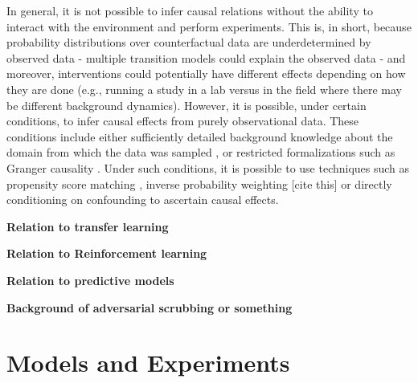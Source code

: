 \documentclass{article}
\begin{document}
In general, it is not possible to infer causal relations without the ability to interact with the environment and perform experiments. This is, in short, because probability distributions over counterfactual data are underdetermined by observed data - multiple transition models could explain the observed data - and moreover, interventions could potentially have different effects depending on how they are done (e.g., running a study in a lab versus in the field where there may be different background dynamics). However, it is possible, under certain conditions, to infer causal effects from purely observational data. These conditions include either sufficiently detailed background knowledge about the domain from which the data was sampled \cite{Pearl2009} \cite{Rosenbaum1983}, or restricted formalizations such as Granger causality \cite{granger1969investigating} \cite{granger1980testing}. Under such conditions, it is possible to use techniques such as propensity score matching \cite{Rosenbaum1983}, inverse probability weighting [cite this] or directly conditioning on confounding to ascertain causal effects.







\textbf{Relation to transfer learning}



\textbf{Relation to Reinforcement learning}




\textbf{Relation to predictive models}



\textbf{Background of adversarial scrubbing or something}





\section{Models and Experiments}

\end{document}
